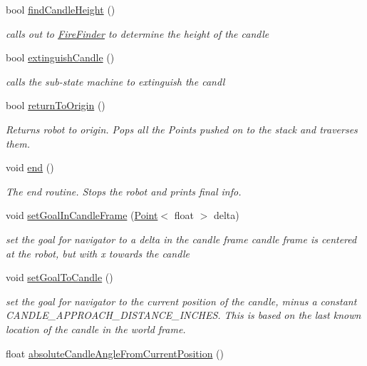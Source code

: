 \begin{DoxyCompactItemize}
bool \hyperlink{classRobot_a17e0de9c529197b3575e11a87470376b}{find\-Candle\-Height} ()
\begin{DoxyCompactList}\small\item\em calls out to \hyperlink{classFireFinder}{Fire\-Finder} to determine the height of the candle \end{DoxyCompactList}\item 
bool \hyperlink{classRobot_a0dfb8f97d6a9448bc6f9ccc5b9efb9fb}{extinguish\-Candle} ()
\begin{DoxyCompactList}\small\item\em calls the sub-\/state machine to extinguish the candl \end{DoxyCompactList}\item 
bool \hyperlink{classRobot_ac1faa7fbfb483c4053dc35f368359c0b}{return\-To\-Origin} ()
\begin{DoxyCompactList}\small\item\em Returns robot to origin. Pops all the Points pushed on to the stack and traverses them. \end{DoxyCompactList}\item 
void \hyperlink{classRobot_a9dab3fb1d3619cbc9b8b1e19f6320c6f}{end} ()
\begin{DoxyCompactList}\small\item\em The end routine. Stops the robot and prints final info. \end{DoxyCompactList}\item 
void \hyperlink{classRobot_a890d4f4ee0eed7fe96f551b52f0d7407}{set\-Goal\-In\-Candle\-Frame} (\hyperlink{classPoint}{Point}$<$ float $>$ delta)
\begin{DoxyCompactList}\small\item\em set the goal for navigator to a delta in the candle frame candle frame is centered at the robot, but with x towards the candle \end{DoxyCompactList}\item 
void \hyperlink{classRobot_a6d144ed908ee859cfadda61e2adcb393}{set\-Goal\-To\-Candle} ()
\begin{DoxyCompactList}\small\item\em set the goal for navigator to the current position of the candle, minus a constant C\-A\-N\-D\-L\-E\-\_\-\-A\-P\-P\-R\-O\-A\-C\-H\-\_\-\-D\-I\-S\-T\-A\-N\-C\-E\-\_\-\-I\-N\-C\-H\-E\-S. This is based on the last known location of the candle in the world frame. \end{DoxyCompactList}\item 
float \hyperlink{classRobot_a100ecac9c55a7c1552bf933e1a2dd9d1}{absolute\-Candle\-Angle\-From\-Current\-Position} ()

\end{DoxyCompactItemize}
